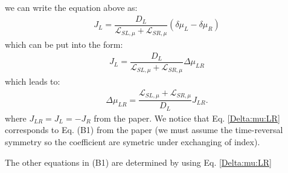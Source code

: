 we can write the equation above as:
\begin{align*}
J_{L}=\dfrac{D_{L}}{\mathcal{L}_{SL,\mu}+\mathcal{L}_{SR,\mu}}(\delta\mu_{L}-\delta\mu_{R})
\end{align*}
which can be put into the form:
\begin{align*}
J_{L}=\dfrac{D_{L}}{\mathcal{L}_{SL,\mu}+\mathcal{L}_{SR,\mu}}\Delta\mu_{LR}
\end{align*}
which leads to:
\begin{align}\label{Delta:mu:LR}
\Delta\mu_{LR}=\dfrac{\mathcal{L}_{SL,\mu}+\mathcal{L}_{SR,\mu}}{D_{L}}J_{LR}.
\end{align} 
where $J_{LR}=J_{L}=-J_{R}$ from the paper. We notice that  Eq. \eqref{Delta:mu:LR} corresponds to Eq. (B1) from the paper (we must assume the time-reversal symmetry so the coefficient are symetric under exchanging of index).

The other equations in (B1) are determined by using Eq. \eqref{Delta:mu:LR}

